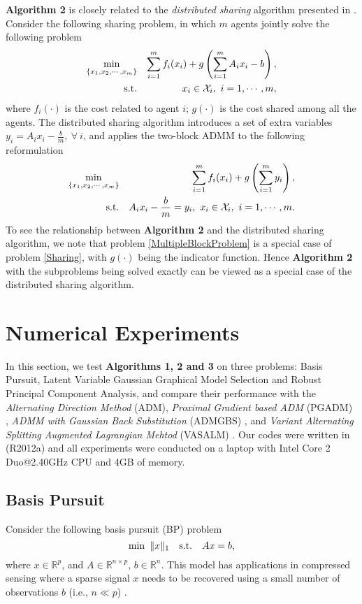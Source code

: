\documentclass{mcom-l}
\theoremstyle{definition}
\theoremstyle{remark}
\numberwithin{equation}{section}
\begin{document}
{\bf Algorithm 2} is closely related to the {\it distributed sharing} algorithm presented in \cite[Chapter 7]{BoydADMMsurvey2011}. Consider the following sharing problem, in which $m$ agents jointly solve the following problem
\begin{eqnarray}\label{Sharing}
\min_{\{ x_1,x_2,\cdots,x_m \}}&&\sum_{i=1}^m f_i (x_i) + g\left(\sum_{i=1}^m A_i x_i - b \right),\\
\hbox{s.t.}&&x_i \in {\mathcal{X}}_i,\ i = 1,\cdots,m,\nonumber
\end{eqnarray}
where $f_i(\cdot)$ is the cost related to agent $i$; $g(\cdot)$ is the cost shared among all the agents. The distributed sharing algorithm introduces a set of extra variables $y_i=A_i x_i - \frac{b}{m},\ \forall \ i$, and applies the two-block ADMM to the following reformulation
\begin{eqnarray}
\min_{\{ x_1,x_2,\cdots,x_m \}}&&\sum_{i=1}^m f_i (x_i) + g\left(\sum_{i=1}^m y_i \right),\nonumber\\
\hbox{s.t.}&& A_i x_i - \frac{b}{m} = y_i, \ x_i\in {\mathcal{X}}_i, \ i = 1,\cdots,m\nonumber.
\end{eqnarray}
To see the relationship between {\bf Algorithm 2} and the distributed sharing algorithm, we note that problem \eqref{MultipleBlockProblem}
is a special case of problem \eqref{Sharing}, with $g(\cdot)$ being the indicator function. Hence {\bf Algorithm 2} with the subproblems
being solved exactly can be viewed as a special case of the distributed sharing algorithm.

\section{Numerical Experiments}\label{secNumerical}
\setcounter{equation}{0}

In this section, we test {\bf Algorithms 1, 2 and 3}  on three problems: Basis Pursuit, Latent Variable Gaussian Graphical Model Selection and Robust Principal Component Analysis, and compare their performance with the {\em{Alternating Direction Method}}  (ADM)\cite{YangZhang2011}, {\em{Proximal Gradient based ADM}} (PGADM) \cite{MaXueZou2012}, {\em{ADMM with Gaussian Back Substitution}} (ADMGBS) \cite{HeTaoYuan2012}, and {\em{Variant Alternating Splitting Augmented Lagrangian Mehtod}}  (VASALM) \cite{TaoYuan2011}. Our codes were written in {}(R2012a) and all experiments were conducted on a laptop with Intel Core 2 Duo@2.40GHz CPU and 4GB of memory.

\subsection{Basis Pursuit}
Consider the following basis pursuit (BP) problem \cite{ChenDonohoSaunders1998}
\begin{equation}\label{BP}
\min\  \|x\|_1\quad \hbox{s.t.}\quad A x = b,
\end{equation}
where $x\in \mathbb{R}^p$, and $A\in \mathbb{R}^{n\times p}$, $b\in \mathbb{R}^n$. This model has applications in compressed sensing where a sparse signal $x$ needs to be recovered using a small number of observations $b$ (i.e., $n\ll p$) \cite{ChenDonohoSaunders1998}.
\end{document}
